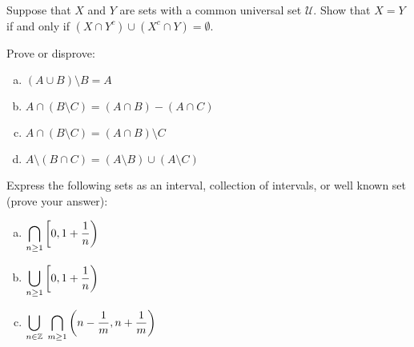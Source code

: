\documentclass[11pt,letterpaper]{article}
\begin{document}
 Suppose that $X$ and $Y$ are sets with a common universal set $\mathscr{U}$. Show that $X= Y$ if and only if $(X \cap Y^c) \cup (X^c \cap Y)= \emptyset$. \pspace





\newpage





 Prove or disprove:
	\begin{enumerate}[(a)]
	\item $(A \cup B) \setminus B= A$
	\item $A \cap (B \setminus C)= (A \cap B) - (A \cap C)$
	\item $A \cap (B \setminus C)= (A \cap B) \setminus C$
	\item $A \setminus (B \cap C)= (A \setminus B) \cup (A \setminus C)$
	\end{enumerate}





\newpage





 Express the following sets as an interval, collection of intervals, or well known set (prove your answer): 
	\begin{enumerate}[(a)]
	\item $\displaystyle\bigcap_{n \geq 1} \left[0, 1 + \frac{1}{n} \right)$
	\item $\displaystyle\bigcup_{n \geq 1} \left[0, 1 + \frac{1}{n} \right)$
	\item $\displaystyle\bigcup_{n \in \mathbb{Z}}\; \bigcap_{m \geq 1} \left( n - \frac{1}{m}, n + \frac{1}{m} \right)$
	\end{enumerate}
\end{document}
